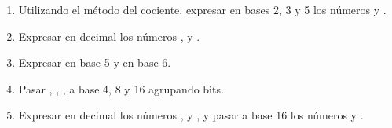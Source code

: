 \begin{enunciado}{\ejercicio}
  \begin{enumerate}[label=\alph*)]
    \item Utilizando el método del cociente, expresar en bases 2, 3 y 5 los números  y .

    \item Expresar en decimal los números ,  y .

    \item Expresar  en base 5 y  en base 6.

    \item Pasar
          ,
          ,
          ,
          a base 4, 8 y 16 agrupando bits.

    \item Expresar en decimal los números ,  y , y pasar a base
          16 los números  y .
  \end{enumerate}
\end{enunciado}

